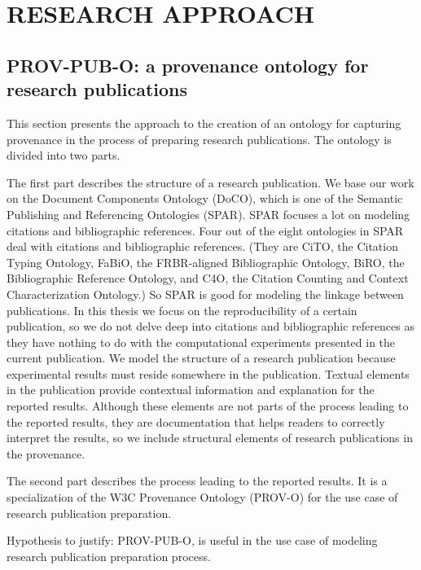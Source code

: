 \chapter{RESEARCH APPROACH}
\section{PROV-PUB-O: a provenance ontology for research publications}
This section presents the approach to the creation of an ontology for capturing provenance in the process of preparing research publications. The ontology is divided into two parts. 

The first part describes the structure of a research publication. We base our work on the Document Components Ontology (DoCO), which is one of the Semantic Publishing and Referencing Ontologies (SPAR). SPAR focuses a lot on modeling citations and bibliographic references. Four out of the eight ontologies in SPAR deal with citations and bibliographic references. (They are CiTO, the Citation Typing Ontology, FaBiO, the FRBR-aligned Bibliographic Ontology, BiRO, the Bibliographic Reference Ontology, and C4O, the Citation Counting and Context Characterization Ontology.) So SPAR is good for modeling the linkage between publications. In this thesis we focus on the reproducibility of a certain publication, so we do not delve deep into citations and bibliographic references as they have nothing to do with the computational experiments presented in the current publication. We model the structure of a research publication because experimental results must reside somewhere in the publication. Textual elements in the publication provide contextual information and explanation for the reported results. Although these elements are not parts of the process leading to the reported results, they are documentation that helps readers to correctly interpret the results, so we include structural elements of research publications in the provenance.

The second part describes the process leading to the reported results. It is a specialization of the W3C Provenance Ontology (PROV-O) for the use case of research publication preparation. 

Hypothesis to justify: PROV-PUB-O, is useful in the use case of modeling research publication preparation process.


